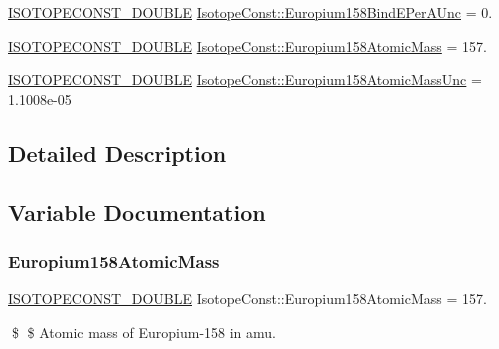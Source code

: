 \begin{DoxyCompactItemize}
\mbox{\hyperlink{group___isotope_const-_macros_ga8f45a7272ce02c0b4c65c44636ed719a}{I\+S\+O\+T\+O\+P\+E\+C\+O\+N\+S\+T\+\_\+\+D\+O\+U\+B\+LE}} \mbox{\hyperlink{group___isotope_const-_europium-_eu158_ga980c943d809c55b7b52b21753b9d0dda}{Isotope\+Const\+::\+Europium158\+Bind\+E\+Per\+A\+Unc}} = 0.
\item 
\mbox{\hyperlink{group___isotope_const-_macros_ga8f45a7272ce02c0b4c65c44636ed719a}{I\+S\+O\+T\+O\+P\+E\+C\+O\+N\+S\+T\+\_\+\+D\+O\+U\+B\+LE}} \mbox{\hyperlink{group___isotope_const-_europium-_eu158_gaa0bda6c63175a9ef0b1c0422fbc1dac0}{Isotope\+Const\+::\+Europium158\+Atomic\+Mass}} = 157.
\item 
\mbox{\hyperlink{group___isotope_const-_macros_ga8f45a7272ce02c0b4c65c44636ed719a}{I\+S\+O\+T\+O\+P\+E\+C\+O\+N\+S\+T\+\_\+\+D\+O\+U\+B\+LE}} \mbox{\hyperlink{group___isotope_const-_europium-_eu158_ga39949f0864b340321fe7e26ca621dfd4}{Isotope\+Const\+::\+Europium158\+Atomic\+Mass\+Unc}} = 1.\+1008e-\/05
\end{DoxyCompactItemize}


\subsection{Detailed Description}


\subsection{Variable Documentation}
\mbox{\label{group___isotope_const-_europium-_eu158_gaa0bda6c63175a9ef0b1c0422fbc1dac0}} 
\subsubsection{\texorpdfstring{Europium158\+Atomic\+Mass}{Europium158AtomicMass}}
{\footnotesize\ttfamily \mbox{\hyperlink{group___isotope_const-_macros_ga8f45a7272ce02c0b4c65c44636ed719a}{I\+S\+O\+T\+O\+P\+E\+C\+O\+N\+S\+T\+\_\+\+D\+O\+U\+B\+LE}} Isotope\+Const\+::\+Europium158\+Atomic\+Mass = 157.}

\$ \$ Atomic mass of Europium-\/158 in amu. \mbox{\label{group___isotope_const-_europium-_eu158_ga39949f0864b340321fe7e26ca621dfd4}} 
